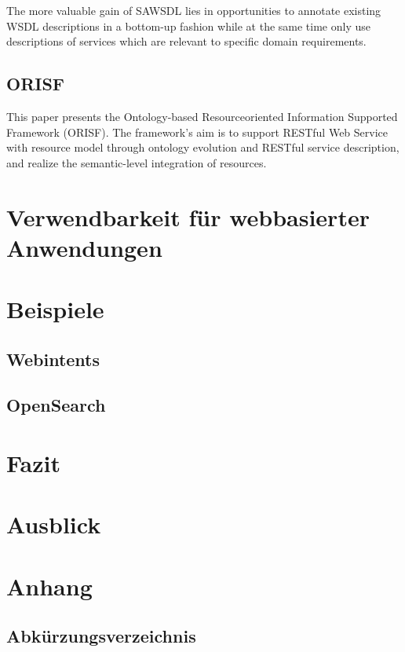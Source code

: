 \documentclass[10pt,a4paper]{article}
\begin{document}
The more valuable
gain of SAWSDL lies in opportunities to annotate existing
WSDL descriptions in a bottom-up fashion while at the
same time only use descriptions of services which are relevant
to specific domain requirements. \cite{WSMOLITE}

\subsection{ORISF}

This paper presents the Ontology-based Resourceoriented
Information Supported Framework (ORISF). The
framework’s aim is to support RESTful Web Service with
resource model through ontology evolution and RESTful
service description, and realize the semantic-level
integration of resources. \cite{zg-ontorest}

\section{Verwendbarkeit für webbasierter Anwendungen}
\label{l:verwendung}
\section{Beispiele}
\label{l:sem-web-ser-beispiele}
\subsection{Webintents}

\subsection{OpenSearch}

\section{Fazit}
\label{l:fazit}
\section{Ausblick}
\label{l:ausblick}
\pagebreak

\section*{Anhang}
\subsection*{Abkürzungsverzeichnis}
\begin{acronym}
\end{acronym}


\end{document}
